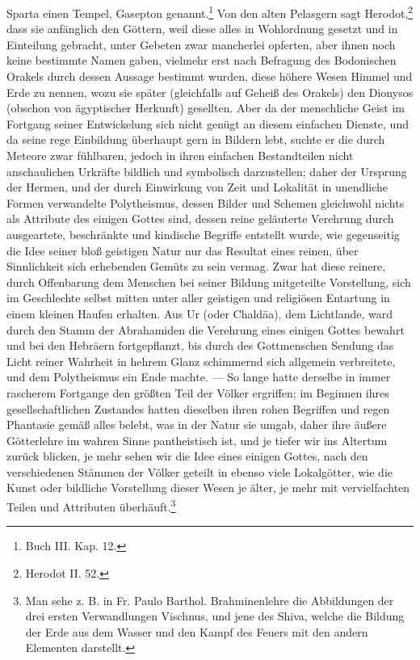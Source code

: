 \documentclass[a4paper, 11pt, oneside, polutonikogreek, german]{article}
\begin{document}
Sparta einen Tempel, Gasepton genannt.\footnote{Buch III. Kap. 12.} Von den alten Pelasgern sagt Herodot,\footnote{Herodot II. 52.} dass sie anfänglich den Göttern, weil diese alles in Wohlordnung gesetzt und in Einteilung gebracht, unter Gebeten zwar mancherlei opferten, aber ihnen noch keine bestimmte Namen gaben, vielmehr erst nach Befragung des Bodonischen Orakels durch dessen Aussage bestimmt wurden, diese höhere Wesen Himmel und Erde zu nennen, wozu sie später (gleichfalls auf Geheiß des Orakels) den Dionysos (obschon von ägyptischer Herkunft) gesellten. Aber da der menschliche Geist im Fortgang seiner Entwickelung sich nicht genügt an diesem einfachen Dienste, und da seine rege Einbildung überhaupt gern in Bildern lebt, suchte er die durch Meteore zwar fühlbaren, jedoch in ihren einfachen Bestandteilen nicht anschaulichen Urkräfte bildlich und symbolisch darzustellen; daher der Ursprung der Hermen, und der durch Einwirkung von Zeit und Lokalität in unendliche Formen verwandelte Polytheismus, dessen Bilder und Schemen gleichwohl nichts als Attribute des einigen Gottes sind, dessen reine geläuterte Verehrung durch ausgeartete, beschränkte und kindische Begriffe entstellt wurde, wie gegenseitig die Idee seiner bloß geistigen Natur nur das Resultat eines reinen, über Sinnlichkeit sich erhebenden Gemüts zu sein vermag. Zwar hat diese reinere, durch Offenbarung dem Menschen bei seiner Bildung mitgeteilte Vorstellung, sich im Geschlechte selbst mitten unter aller geistigen und religiösen Entartung in einem kleinen Haufen erhalten. Aus Ur (oder Chaldäa), dem Lichtlande, ward durch den Stamm der Abrahamiden die Verehrung eines einigen Gottes bewahrt und bei den Hebräern fortgepflanzt, bis durch des Gottmenschen Sendung das Licht reiner Wahrheit in hehrem Glanz schimmernd sich allgemein verbreitete, und dem Polytheismus ein Ende machte. --- So lange hatte derselbe in immer rascherem Fortgange den größten Teil der Völker ergriffen; im Beginnen ihres gesellschaftlichen Zustandes hatten dieselben ihren rohen Begriffen und regen Phantasie gemäß alles belebt, was in der Natur sie umgab, daher ihre äußere Götterlehre im wahren Sinne pantheistisch ist, und je tiefer wir ins Altertum zurück blicken, je mehr sehen wir die Idee eines einigen Gottes, nach den verschiedenen Stämmen der Völker geteilt in ebenso viele Lokalgötter, wie die Kunst oder bildliche Vorstellung dieser Wesen je älter, je mehr mit vervielfachten Teilen und Attributen überhäuft.\footnote{Man sehe z. B. in Fr. Paulo Barthol. Brahminenlehre die Abbildungen der drei ersten Verwandlungen Vischnus, und jene des Shiva, welche die Bildung der Erde aus dem Wasser und den Kampf des Feuers mit den andern Elementen darstellt.}
\end{document}
